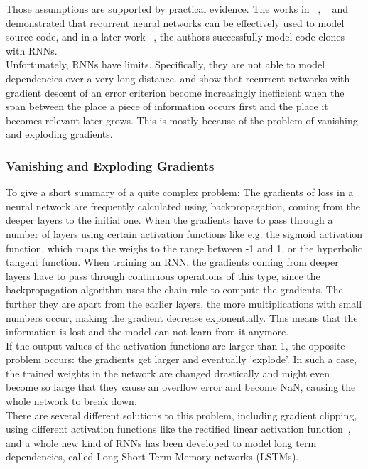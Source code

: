 \documentclass[
	a4paper,
	pagesize,
	pdftex,
	12pt,
	twoside, %
	BCOR=5mm, %
	ngerman,
	fleqn,
	final,
	]{scrartcl}
\begin{document}
Those assumptions are supported by practical evidence. The works in ~\cite{White.2015}, ~\cite{Dam.2016b} and ~\cite{Dam.2016} demonstrated that recurrent neural networks can be effectively used to model source code, and in a later work ~\cite{White.2016}, the authors successfully model code clones with RNNs.\\
Unfortunately, RNNs have limits. Specifically, they are not able to model dependencies over a very long distance. \cite{Hochreiter.1991} and \cite{Bengio.1994} show that recurrent networks with gradient descent of an error criterion become increasingly inefficient when the span between the place a piece of information occurs first and the place it becomes relevant later grows. This is mostly because of the problem of vanishing and exploding gradients.\\

\subsubsection{Vanishing and Exploding Gradients}
To give a short summary of a quite complex problem: The gradients of loss in a neural network are frequently calculated using backpropagation, coming from the deeper layers to the initial one. When the gradients have to pass through a number of layers using certain activation functions like e.g. the sigmoid activation function, which maps the weighs to the range between -1 and 1, or the hyperbolic tangent function. When training an RNN, the gradients coming from deeper layers have to pass through continuous operations of this type, since the backpropagation algorithm uses the chain rule to compute the gradients. The further they are apart from the earlier layers, the more multiplications with small numbers occur, making the gradient decrease exponentially. This means that the information is lost and the model can not learn from it anymore.\\
If the output values of the activation functions are larger than 1, the opposite problem occurs: the gradients get larger and eventually 'explode'. In such a case, the trained weights in the network are changed drastically and might even become so large that they cause an overflow error and become NaN, causing the whole network to break down.\\ %
There are several different solutions to this problem, including gradient clipping, using different activation functions like the rectified linear activation function~\cite{Glorot.2011}, and a whole new kind of RNNs has been developed to model long term dependencies, called Long Short Term Memory networks (LSTMs).
\end{document}

